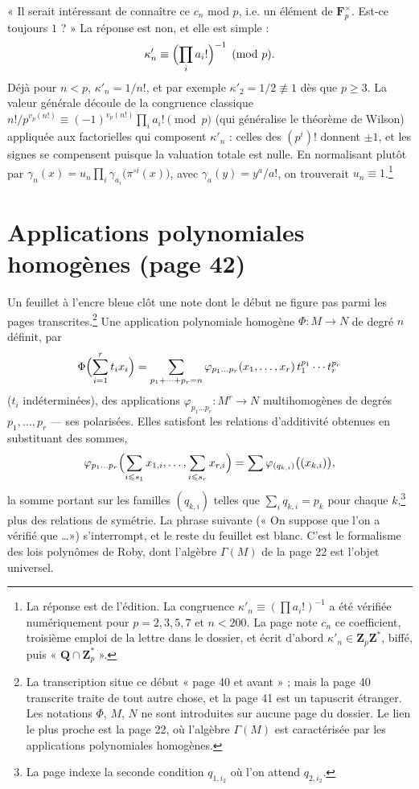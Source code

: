 \documentclass[11pt,a4paper]{article}
\begin{document}
« Il serait intéressant de connaître ce $c_n$ mod $p$, i.e. un élément de
$\mathbf{F}_p^{\times}$. Est-ce toujours $1$ ? » La réponse est non, et elle
est simple :
\[
\kappa'_n \equiv \Bigl(\prod_i a_i!\Bigr)^{-1} \pmod p .
\]
Déjà pour $n < p$, $\kappa'_n = 1/n!$, et par exemple $\kappa'_2 = 1/2 \not\equiv
1$ dès que $p \geqslant 3$. La valeur générale découle de la congruence
classique $n!/p^{v_p(n!)} \equiv (-1)^{v_p(n!)}\prod_i a_i! \pmod p$ (qui
généralise le théorème de Wilson) appliquée aux factorielles qui composent
$\kappa'_n$ : celles des $(p^{i})!$ donnent $\pm 1$, et les signes se
compensent puisque la valuation totale est nulle. En normalisant plutôt
par $\gamma_n(x) = u_n \prod_i \gamma_{a_i}\bigl(\pi^{\circ i}(x)\bigr)$,
avec $\gamma_{a}(y) = y^{a}/a!$, on trouverait $u_n \equiv 1$.\footnote{La
réponse est de l'édition. La congruence $\kappa'_n \equiv (\prod a_i!)^{-1}$
a été vérifiée numériquement pour $p = 2, 3, 5, 7$ et $n < 200$. La page
note $c_n$ ce coefficient, troisième emploi de la lettre dans le dossier, et
écrit d'abord $\kappa'_n \in \mathbf{Z}_{p}\mathbf{Z}^{*}$, biffé, puis
« $\mathbf{Q} \cap \mathbf{Z}_p^{*}$ ».}

\section*{Applications polynomiales homogènes (page 42)}

Un feuillet à l'encre bleue clôt une note dont le début ne figure pas parmi
les pages transcrites.\footnote{La transcription situe ce début « page 40 et
avant » ; mais la page 40 transcrite traite de tout autre chose, et la page
41 est un tapuscrit étranger. Les notations $\Phi$, $M$, $N$ ne sont
introduites sur aucune page du dossier. Le lien le plus proche est la page
22, où l'algèbre $\Gamma(M)$ est caractérisée par les applications
polynomiales homogènes.} Une application polynomiale homogène $\Phi : M \to
N$ de degré $n$ définit, par
\[
\Phi\Bigl(\sum_{i=1}^{r} t_i x_i\Bigr) = \sum_{p_1 + \cdots + p_r = n}
\varphi_{p_1 \ldots p_r}(x_1, \ldots, x_r)\, t_1^{p_1}\cdots t_r^{p_r}
\]
($t_i$ indéterminées), des applications $\varphi_{p_1\ldots p_r} : M^{r} \to
N$ multihomogènes de degrés $p_1, \ldots, p_r$ — ses polarisées. Elles
satisfont les relations d'additivité obtenues en substituant des sommes,
\[
\varphi_{p_1\ldots p_r}\Bigl(\sum_{i \leqslant s_1} x_{1,i}, \ldots,
\sum_{i \leqslant s_r} x_{r,i}\Bigr) = \sum
\varphi_{(q_{k,i})}\bigl((x_{k,i})\bigr),
\]
la somme portant sur les familles $(q_{k,i})$ telles que $\sum_i q_{k,i} =
p_k$ pour chaque $k$,\footnote{La page indexe la seconde condition
$q_{1,i_2}$ où l'on attend $q_{2,i_2}$.} plus des relations de symétrie. La
phrase suivante (« On suppose que l'on a vérifié que \ldots ») s'interrompt,
et le reste du feuillet est blanc. C'est le formalisme des lois polynômes de
Roby, dont l'algèbre $\Gamma(M)$ de la page 22 est l'objet universel.
\end{document}
